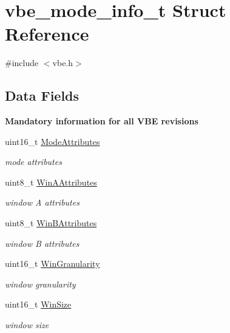 \hypertarget{structvbe__mode__info__t}{}\section{vbe\+\_\+mode\+\_\+info\+\_\+t Struct Reference}
\label{structvbe__mode__info__t}


{\ttfamily \#include $<$vbe.\+h$>$}

\subsection*{Data Fields}
\begin{Indent}{\bf Mandatory information for all V\+BE revisions}\par
\begin{DoxyCompactItemize}
\item 
uint16\+\_\+t \hyperlink{structvbe__mode__info__t_ad7593abf9d201ce5e59de60baba548cd}{Mode\+Attributes}
\begin{DoxyCompactList}\small\item\em mode attributes \end{DoxyCompactList}\item 
uint8\+\_\+t \hyperlink{structvbe__mode__info__t_aaa90049ea7f03763acbbf75240f4f5d8}{Win\+A\+Attributes}
\begin{DoxyCompactList}\small\item\em window A attributes \end{DoxyCompactList}\item 
uint8\+\_\+t \hyperlink{structvbe__mode__info__t_a370ddeb84e904ef1000fe57905ebf6b8}{Win\+B\+Attributes}
\begin{DoxyCompactList}\small\item\em window B attributes \end{DoxyCompactList}\item 
uint16\+\_\+t \hyperlink{structvbe__mode__info__t_a38f205f799c6929629395f03e24de077}{Win\+Granularity}
\begin{DoxyCompactList}\small\item\em window granularity \end{DoxyCompactList}\item 
uint16\+\_\+t \hyperlink{structvbe__mode__info__t_a78985f1c5ae166cb560099273cc558b4}{Win\+Size}
\begin{DoxyCompactList}\small\item\em window size \end{DoxyCompactList}\item 

\end{DoxyCompactItemize}
\end{Indent}

